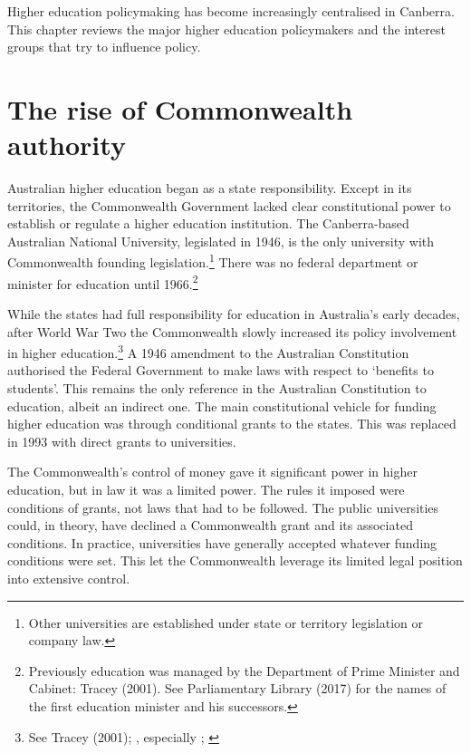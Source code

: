 \documentclass{grattan}
\begin{document}
Higher education policymaking has become increasingly centralised in Canberra. This chapter reviews the major higher education policymakers and the interest groups that try to influence policy.

%
\section{The rise of Commonwealth authority}\label{sec:the-rise-of-commonwealth-authority}

Australian higher education began as a state responsibility. Except in its territories, the Commonwealth Government lacked clear constitutional power to establish or regulate a higher education institution. The Canberra-based Australian National University, legislated in 1946, is the only university with Commonwealth founding legislation.\footnote{Other universities are established under state or territory legislation or company law.} There was no federal department or minister for education until 1966.\footnote{Previously education was managed by the Department of Prime Minister and Cabinet: Tracey (2001). See Parliamentary Library (2017) for the names of the first education minister and his successors.}

While the states had full responsibility for education in Australia's early decades, after World War Two the Commonwealth slowly increased its policy involvement in higher education.\footnote{See Tracey (2001); \textcite[][]{Forsyth2014ahistoryofthemo}, especially ; \textcite[][chapter~4.]{DepartmentofPrimeMinisterandCabinet2014reformofthefeder}} A 1946 amendment to the Australian Constitution authorised the Federal Government to make laws with respect to `benefits to students'. This remains the only reference in the Australian Constitution to education, albeit an indirect one. The main constitutional vehicle for funding higher education was through conditional grants to the states. This was replaced in 1993 with direct grants to universities.

The Commonwealth's control of money gave it significant power in higher education, but in law it was a limited power. The rules it imposed were conditions of grants, not laws that had to be followed. The public universities could, in theory, have declined a Commonwealth grant and its associated conditions. In practice, universities have generally accepted whatever funding conditions were set. This let the Commonwealth leverage its limited legal position into extensive control.
\end{document}

